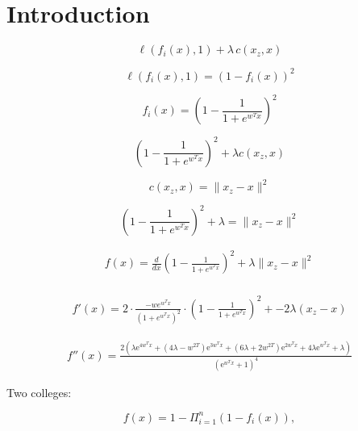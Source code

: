 \documentclass{article}
\begin{document}
\section{Introduction}

\begin{equation}
\label{eq:recourse}
\ell(f_i(x), 1) + \lambda \, c(x_z, x)
\end{equation}

\begin{equation}
\ell(f_i(x), 1) = (1 - f_i(x))^2
\end{equation}

\begin{equation}
f_i(x) = (1-\frac{1}{1+e^{w^T x}})^2
\end{equation}

\begin{equation}
(1-\frac{1}{1+e^{w^T x}})^2 + \lambda c(x_z, x)
\end{equation}

\begin{equation}
c(x_z, x) = \|x_z - x\|^2 
\end{equation}

\begin{equation}
(1-\frac{1}{1+e^{w^T x}})^2 + \lambda =\|x_z - x\|^2 
\end{equation}

\begin{align}
f(x) = \frac{d}{dx}(1-\frac{1}{1+e^{w^T x}})^2 + \lambda \|x_z - x\|^2 \\ 
\end{align}

\begin{align}
f'(x)= 2 \cdot \frac{-we^{w^Tx}}{ (1 + e^{w^T x})^2 } \cdot (1-\frac{1}{1+e^{w^T x}})^2 + -2\lambda (x_z - x)
\end{align}

\begin{align}
f''(x) = \frac{2 \left({\lambda}\mathrm{e}^{4w^{T} x} + \left(4{\lambda} - w^{2T}\right) \mathrm{e}^{3w^{T} x} + \left(6{\lambda} + 2w^{2T}\right) \mathrm{e}^{2w^{T} x} + 4{\lambda}\mathrm{e}^{w^{T} x} + {\lambda}\right)}{\left(\mathrm{e}^{w^{T} x} + 1\right)^{4}}
\end{align}

Two colleges:

\begin{equation}
f(x)=1-\Pi_{i=1}^n(1-f_i(x)),
\end{equation}
\end{document}
